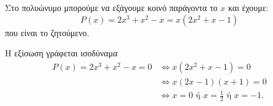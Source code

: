 \begin{alist}
\item Στο πολυώνυμο μπορούμε να εξάγουμε κοινό παράγοντα το $x$ και έχουμε:
\[P(x) = 2x^3 + x^2 - x = x(2x^2 + x - 1)\] που είναι το ζητούμενο.
\item Η εξίσωση γράφεται ισοδύναμα 
\begin{align*}
P(x) = 2x^3 + x^2 - x = 0 &\Leftrightarrow x(2x^2 + x - 1) = 0 \\
&\Leftrightarrow x(2x - 1)(x + 1) = 0 \\
&\Leftrightarrow x = 0 \text{ ή } x = \frac{1}{2} \text{ ή } x = -1.
\end{align*}
\end{alist}

